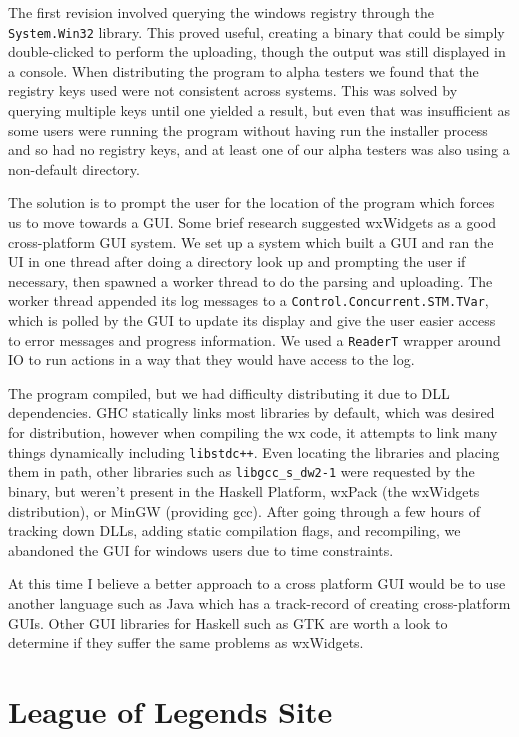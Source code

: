 \documentclass[letterpaper,twocolumn,9pt]{article}
\newcommand{\code}[1]{\texttt{#1}}
\begin{document}
The first revision involved querying the windows registry through the \code{System.Win32} library.  This proved useful, creating a binary that could be simply double-clicked to perform the uploading, though the output was still displayed in a console.  When distributing the program to alpha testers we found that the registry keys used were not consistent across systems.  This was solved by querying multiple keys until one yielded a result, but even that was insufficient as some users were running the program without having run the installer process and so had no registry keys, and at least one of our alpha testers was also using a non-default directory.

The solution is to prompt the user for the location of the program which forces us to move towards a GUI.  Some brief research suggested wxWidgets as a good cross-platform GUI system.  We set up a system which built a GUI and ran the UI in one thread after doing a directory look up and prompting the user if necessary, then spawned a worker thread to do the parsing and uploading.  The worker thread appended its log messages to a \code{Control.Concurrent.STM.TVar}, which is polled by the GUI to update its display and give the user easier access to error messages and progress information.  We used a \code{ReaderT} wrapper around IO to run actions in a way that they would have access to the log.

The program compiled, but we had difficulty distributing it due to DLL dependencies.  GHC statically links most libraries by default, which was desired for distribution, however when compiling the wx code, it attempts to link many things dynamically including \code{libstdc++}.  Even locating the libraries and placing them in path, other libraries such as \code{libgcc\_s\_dw2-1} were requested by the binary, but weren't present in the Haskell Platform, wxPack (the wxWidgets distribution), or MinGW (providing gcc).  After going through a few hours of tracking down DLLs, adding static compilation flags, and recompiling, we abandoned the GUI for windows users due to time constraints. 

At this time I believe a better approach to a cross platform GUI would be to use another language such as Java which has a track-record of creating cross-platform GUIs. Other GUI libraries for Haskell such as GTK are worth a look to determine if they suffer the same problems as wxWidgets.

\section{League of Legends Site}
\label{site}
\end{document}
